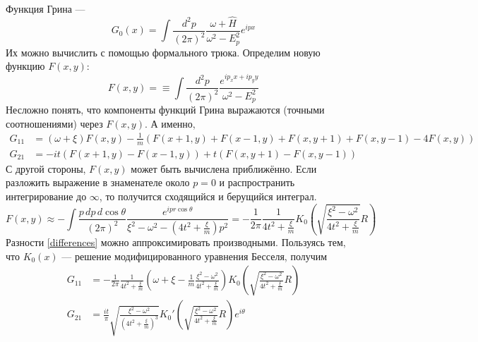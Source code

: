 Функция Грина --- 
\begin{equation}
    G_0(x) = \int \frac{d^2 p}{(2\pi)^2} 
            \frac{\omega + \hat{H}}{\omega^2 - E_p^2} e^{ipx}
\end{equation}
Их можно вычислить с помощью формального трюка. Определим новую функцию
$F(x,y)$:
\begin{equation}
    F(x,y) = \equiv \int \frac{d^2 p}{(2\pi)^2} 
            \frac{e^{ip_x x + ip_y y}}{\omega^2 - E_p^2} 
\end{equation}
Несложно понять, что компоненты функций Грина выражаются (точными соотношениями)
 через $F(x,y)$. А именно,
\begin{equation}
    \label{differences}
    \begin{split}
        G_{11} & = (\omega + \xi) F(x,y) - 
            \frac{1}{m}(F(x+1,y) + F(x-1,y) + F(x,y+1) + F(x, y-1) - 4F(x,y))\\
        G_{21} & = -it(F(x+1,y) - F(x-1,y)) + t(F(x,y+1) - F(x,y-1))
    \end{split}
\end{equation}
С другой стороны, $F(x,y)$ может быть вычислена приближённо. Если разложить 
выражение в знаменателе около $p = 0$ и распространить интегрирование до $\infty$, то получится
сходящийся и берущийся интеграл.
\begin{equation}
    F(x,y) \approx -\int \frac{p\,dp\,d\cos{\theta}}{(2\pi)^2} 
        \frac{e^{ipr\cos{\theta}}}{\xi^2 - \omega^2 - (4t^2 + \frac{\xi}{m})p^2} = 
        -\frac{1}{2\pi} \frac{1}{4t^2 + \frac{\xi}{m}}
        K_0 \left(\sqrt{\frac{\xi^2 - \omega^2}{4t^2 + \frac{\xi}{m}}}R \right)
\end{equation}
Разности \eqref{differences} можно аппроксимировать производными. Пользуясь тем, что
$K_0(x)$ --- решение модифицированного уравнения Бесселя, получим 
\begin{equation}
    \begin{split}
        G_{11} & = -\frac{1}{2\pi} \frac{1}{4t^2 + \frac{\xi}{m}}
        \left( \omega + \xi - \frac{1}{m} \frac{\xi^2 - \omega^2}{4t^2 + \frac{\xi}{m}} \right)
        K_0 \left(\sqrt{\frac{\xi^2 - \omega^2}{4t^2 + \frac{\xi}{m}}}R \right)\\
        G_{21} & = \frac{it}{\pi} \sqrt{\frac{\xi^2 - \omega^2}
                                     {(4t^2 + \frac{\xi}{m})^{3}}}
        K_0' \left(\sqrt{\frac{\xi^2 - \omega^2}{4t^2 + \frac{\xi}{m}}}R \right)e^{i\theta}
    \end{split}
\end{equation}

